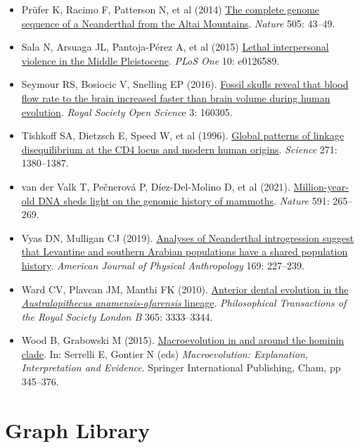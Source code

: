 \documentclass[
]{book}
\begin{document}
\begin{itemize}
\item
  Prüfer K, Racimo F, Patterson N, et al (2014) \href{https://www.nature.com/articles/nature12886}{The complete genome sequence of a Neanderthal from the Altai Mountains}. \emph{Nature} 505: 43--49.
\item
  Sala N, Arsuaga JL, Pantoja-Pérez A, et al (2015) \href{https://journals.plos.org/plosone/article?id=10.1371/journal.pone.0126589}{Lethal interpersonal violence in the Middle Pleistocene}. \emph{PLoS One} 10: e0126589.
\item
  Seymour RS, Bosiocic V, Snelling EP (2016). \href{https://royalsocietypublishing-org.er.lib.k-state.edu/doi/10.1098/rsos.160305}{Fossil skulls reveal that blood flow rate to the brain increased faster than brain volume during human evolution}. \emph{Royal Society Open Scienc}e 3: 160305.
\item
  Tishkoff SA, Dietzsch E, Speed W, et al (1996). \href{https://www.science.org/doi/abs/10.1126/science.271.5254.1380}{Global patterns of linkage disequilibrium at the CD4 locus and modern human origins}. \emph{Science} 271: 1380--1387.
\item
  van der Valk T, Pečnerová P, Díez-Del-Molino D, et al (2021). \href{https://www.nature.com/articles/s41586-021-03224-9}{Million-year-old DNA sheds light on the genomic history of mammoths}. \emph{Nature} 591: 265--269.
\item
  Vyas DN, Mulligan CJ (2019). \href{https://onlinelibrary.wiley.com/doi/10.1002/ajpa.23818}{Analyses of Neanderthal introgression suggest that Levantine and southern Arabian populations have a shared population history}. \emph{American Journal of Physical Anthropology} 169: 227--239.
\item
  Ward CV, Plavcan JM, Manthi FK (2010). \href{https://royalsocietypublishing.org/doi/10.1098/rstb.2010.0039}{Anterior dental evolution in the \emph{Australopithecus anamensis-afarensis} lineage}. \emph{Philosophical Transactions of the Royal Society London B} 365: 3333--3344.
\item
  Wood B, Grabowski M (2015). \href{https://link.springer.com/chapter/10.1007/978-3-319-15045-1_11}{Macroevolution in and around the hominin clade}. In: Serrelli E, Gontier N (eds) \emph{Macroevolution: Explanation, Interpretation and Evidence}. Springer International Publishing, Cham, pp 345--376.
\end{itemize}

\hypertarget{appendix-appendix-i}{%
\appendix}


\hypertarget{graph-library}{%
\chapter{Graph Library}\label{graph-library}}
\end{document}
